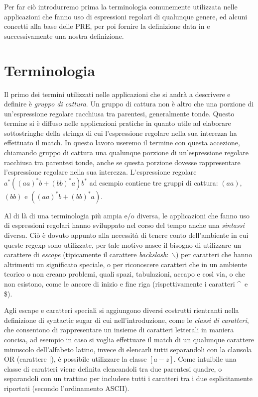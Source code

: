 Per far ciò introdurremo prima la terminologia comunemente utilizzata nelle applicazioni che fanno uso di espressioni regolari di qualunque genere, ed alcuni concetti alla base delle PRE, per poi fornire la definizione data in \cite{campeanu:formal_study} e successivamente una nostra definizione.

\section{Terminologia}

Il primo dei termini utilizzati nelle applicazioni che si andrà a descrivere e definire è \textit{gruppo di cattura}. Un gruppo di cattura non è altro che una porzione di un'espressione regolare racchiusa tra parentesi, generalmente tonde. Questo termine si è diffuso nelle applicazioni pratiche in quanto utile ad elaborare sottostringhe della stringa di cui l'espressione regolare nella sua interezza ha effettuato il match. In questo lavoro useremo il termine con questa accezione, chiamando gruppo di cattura una qualunque porzione di un'espressione regolare racchiusa tra parentesi tonde, anche se questa porzione dovesse rappresentare l'espressione regolare nella sua interezza. L'espressione regolare $a^*((aa)^*b + (bb)^*a)b^*$ ad esempio contiene tre gruppi di cattura: $(aa)$, $(bb)$ e $((aa)^*b + (bb)^*a)$.

Al di là di una terminologia più ampia e/o diversa, le applicazioni che fanno uso di espressioni regolari hanno sviluppato nel corso del tempo anche una \textit{sintassi} diversa. Ciò è dovuto appunto alla necessità di tenere conto dell'ambiente in cui queste regexp sono utilizzate, per tale motivo nasce il bisogno di utilizzare un carattere di \textit{escape} (tipicamente il carattere \textit{backslash}:~$\backslash$) per caratteri che hanno altrimenti un significato speciale, o per riconoscere caratteri che in un ambiente teorico o non creano problemi, quali spazi, tabulazioni, accapo e così via, o che non esistono, come le ancore di inizio e fine riga (rispettivamente i caratteri \^~e \$).

Agli escape e caratteri speciali si aggiungono diversi costrutti rientranti nella definizione di syntactic sugar di cui nell'introduzione, come le \textit{classi di caratteri}, che consentono di rappresentare un insieme di caratteri letterali in maniera concisa, ad esempio in caso si voglia effettuare il match di un qualunque carattere minuscolo dell'alfabeto latino, invece di elencarli tutti separandoli con la clausola OR (carattere $\vert$), è possibile utilizzare la classe $[a-z]$. Come intuibile una classe di caratteri viene definita elencandoli tra due parentesi quadre, o separandoli con un trattino per includere tutti i caratteri tra i due esplicitamente riportati (secondo l'ordinamento ASCII).

